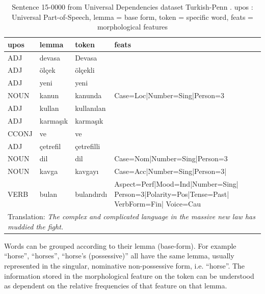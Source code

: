 \documentclass[a4paper]{article}
\begin{document}
\begin{table}[h]
    \centering
    \caption{Sentence 15-0000 from Universal Dependencies dataset Turkish-Penn \citep{kuzgun_2020_UD_turkish_penn}. upos : Universal Part-of-Speech, lemma = base form, token = specific word, feats = morphological features} %
    \label{tab:turkish_example}   
    \begin{tabular}{p{1.5cm}p{2cm}p{2cm}p{6cm}}
\toprule
	\textbf{upos}	&	\textbf{lemma}	&	\textbf{token}	&	\textbf{feats}	\\
    \midrule
	ADJ	&	devasa	&	Devasa	&	\\    \midrule
	ADJ	&	ölçek	&	ölçekli	&\\    \midrule
ADJ	&	yeni	&	yeni	&		\\    \midrule
	NOUN	&	kanun	&	kanunda	&	Case=Loc|Number=Sing|Person=3	\\    \midrule
	ADJ	&	kullan	&	kullanılan	&		\\    \midrule
ADJ	&	karmaşık	&	karmaşık	&\\    \midrule
CCONJ	&	ve	&	ve	&		\\    \midrule
ADJ	&	çetrefil	&	çetrefilli	&		\\    \midrule
	NOUN	&	dil	&	dil	&	Case=Nom|Number=Sing|Person=3	\\    \midrule
	NOUN	&	kavga	&	kavgayı	&	Case=Acc|Number=Sing|Person=3|	\\    \midrule
	VERB	&	bulan	&	bulandırdı	&	Aspect=Perf|Mood=Ind|Number=Sing| Person=3|Polarity=Pos|Tense=Past| VerbForm=Fin| Voice=Cau	\\\midrule
   \multicolumn{4}{p{11cm}}{Translation: \textit{The complex and complicated language in the massive new law has muddied the fight.}}\\    \bottomrule


    \end{tabular}
\end{table}

Words can be grouped according to their lemma (base-form). 
For example ``horse'', ``horses'', ``horse's (possessive)'' all have the same lemma, usually represented in the singular, nominative non-possessive form, i.e. ``horse''.
The information stored in the morphological feature on the token can be understood as dependent on the relative frequencies of that feature on that lemma. 
\end{document}
